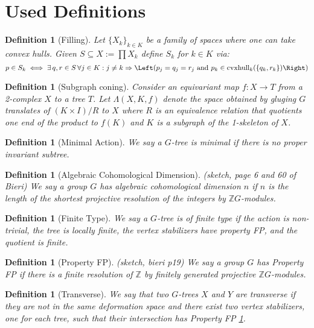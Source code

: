 \documentclass{article}
\theoremstyle{mystyle}
\newtheorem{defn}[thm]{Definition}
\theoremstyle{remark}
\begin{document}
\section{Used Definitions}
\begin{defn}
	[Filling]
	\label{defn:filling}
    Let \(\{X_{k}\}_{k \in K}\) be a family of spaces where one can take convex hulls. Given \(S \subseteq X := \prod X_{k}\) define \(S_{k}\) for \(k \in K\) via: \[p \in S_{k} \iff \exists \,q,r\in S\, \forall j\in K: j\neq k \Rightarrow \Left(p_{j} = q_{j} = r_{j} \text{ and } p_{k} \in \text{cvxhull}_k (\{q_{k} , r_{k}\})\Right)\] 
\end{defn}
\begin{defn}
    [Subgraph coning]
    \label{defn:coneoff}
    Consider an equivariant map $f: X \to T$ from a 2-complex $X$ to a tree $T$. Let $\Lambda(X,K,f)$ denote the space obtained by gluging $G$ translates of $(K \times I) / R$ to $X$ where $R$ is an equivalence relation that quotients one end of the product to $f(K)$ and $K$ is a subgraph of the 1-skeleton of $X$.
\end{defn}
\begin{defn}
    [Minimal Action]
    \label{defn:minimal}
    We say a $G$-tree is \emph{minimal} if there is no proper invariant subtree.
\end{defn}
\begin{defn}
    [Algebraic Cohomological Dimension]
    \label{defn:cd}
    (sketch, page 6 and 60 of Bieri)
    We say a group $G$ has algebraic cohomological dimension $n$ if $n$ is the length of the shortest projective resolution of the integers by $\mathbb{Z}G$-modules. 
\end{defn}
\begin{defn}
    [Finite Type]
    \label{defn:finitetype} 
    We say a $G$-tree is of \emph{finite type} if the action is non-trivial, the tree is locally finite, the vertex stabilizers have property FP, and the quotient is finite.
\end{defn}
\begin{defn}
[Property FP]
\label{defn:propertyfp}
(sketch, bieri p19)
We say a group $G$ has Property FP if there is a finite resolution of $\mathbb{Z}$ by finitely generated projective $\mathbb{Z}G$-modules.
\end{defn}
\begin{defn}
    [Transverse]
    \label{defn:transverse} 
    We say that two $G$-trees $X$ and $Y$ are \emph{transverse} if they are not in the same deformation space and there exist two vertex stabilizers, one for each tree, such that their intersection has Property FP \ref{defn:propertyfp}.
\end{defn}
\end{document}
